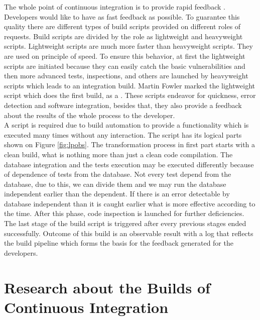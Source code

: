 The whole point of continuous integration is to provide rapid feedback \cite{MartinFowler}. Developers would like to have as fast feedback as possible. To guarantee this quality there are different types of build scripts provided on different roles of requests. Build scripts are divided by the role as lightweight and heavyweight scripts. Lightweight scripts are much more faster than heavyweight scripts. They are used on principle of speed. To ensure this behavior, at first the lightweight scripts are initiated because they can easily catch the basic vulnerabilities and then more advanced tests, inspections, and others are launched by heavyweight scripts which leads to an integration build. Martin Fowler marked the lightweight script which does the first build, as a  \cite{MartinFowler}. These scripts endeavor for quickness, error detection and software integration, besides that, they also provide a feedback about the results of the whole process to the developer.\\

A script is required due to build automation to provide a  functionality which is executed many times without any interaction. The script has its logical parts shown on Figure \ref{fig:lpobs}. The transformation process in first part starts with a clean build, what is nothing more than just a clean code compilation. The database integration and the tests execution may be executed differently because of dependence of tests from the database. Not every test depend from the database, due to this, we can divide them and we may run the database independent earlier than the dependent. If there is an error detectable by database independent than it is caught earlier what is more effective according to the time. After this phase, code inspection is launched for further deficiencies. The last stage of the build script is triggered after every previous stages ended successfully. Outcome of this build is an observable result with a log that reflects the build pipeline which forms the basis for the feedback generated for the developers.

\section{Research about the Builds of Continuous Integration}

